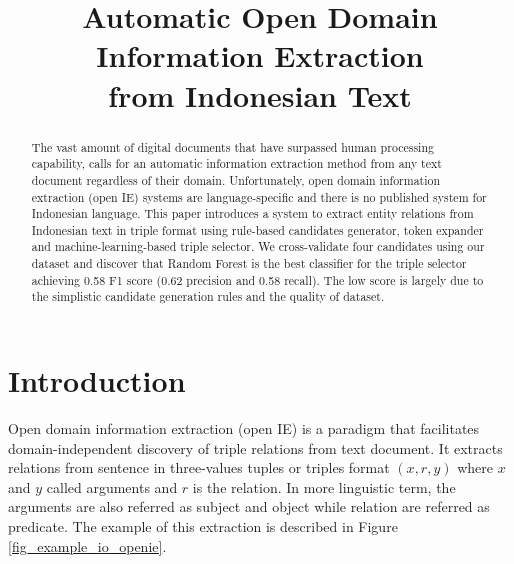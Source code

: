 \documentclass[peerreview,12pt]{IEEEtran}
\begin{document}
\title{Automatic Open Domain Information Extraction\\from Indonesian Text}


\author{
	\and
}


\maketitle

\begin{abstract}

The vast amount of digital documents that have surpassed human processing capability, calls for an automatic information extraction method from any text document regardless of their domain. Unfortunately, open domain information extraction (open IE) systems are language-specific and there is no published system for Indonesian language. This paper introduces a system to extract entity relations from Indonesian text in triple format using rule-based candidates generator, token expander and machine-learning-based triple selector. We cross-validate four candidates using our dataset and discover that Random Forest is the best classifier for the triple selector achieving 0.58 F1 score (0.62 precision and 0.58 recall). The low score is largely due to the simplistic candidate generation rules and the quality of dataset.

\end{abstract}

\IEEEpeerreviewmaketitle

\section{Introduction}

Open domain information extraction (open IE) is a paradigm that facilitates domain-independent discovery of triple relations from text document\cite{banko2007open}. It extracts relations from sentence in three-values tuples or triples format $(x, r, y)$ where $x$ and $y$ called arguments and $r$ is the relation\cite{etzioni2011open}. In more linguistic term, the arguments are also referred as subject and object while relation are referred as predicate\cite{angeli2015leveraging}. The example of this extraction is described in Figure \ref{fig_example_io_openie}.
\end{document}

